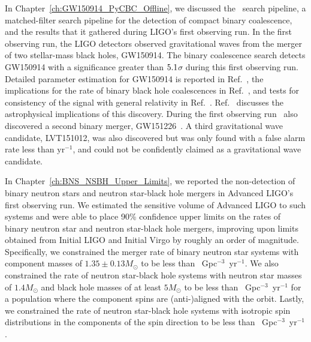 
In Chapter~\ref{ch:GW150914_PyCBC_Offline}, we discussed the \pycbc{}\ search pipeline, a matched-filter
search pipeline for the detection of compact binary coalescence, and the results
that it gathered during LIGO's first observing run. In the first observing run, the LIGO detectors observed
gravitational waves from the merger of two
stellar-mass black holes, GW150914. The binary coalescence search detects GW150914 with
a significance greater than $5.1$$\sigma$ during this first observing
run. Detailed parameter estimation for
GW150914 is reported in Ref.~\cite{GW150914-PARAMESTIM}, the implications for
the rate of binary black hole coalescences in Ref.~\cite{GW150914-RATES}, and
tests for consistency of the signal with general relativity in
Ref.~\cite{GW150914-TESTOFGR}.  Ref.~\cite{GW150914-ASTRO} discusses the
astrophysical implications of this discovery. During the first observing run
\pycbc{}\ also discovered a second binary merger, GW151226~\cite{Abbott:2016nmj}. A third
gravitational wave candidate, LVT151012, was also discovered but was only found
with a false alarm rate less than \CBCSECONDEVENTFAR $\text{yr}^{-1}$, and could not be
confidently claimed as a gravitational wave candidate.

In Chapter~\ref{ch:BNS_NSBH_Upper_Limits}, we reported the non-detection of binary neutron stars and neutron star-black hole mergers
in Advanced \ac{LIGO}'s first observing run.
We estimated the sensitive volume of Advanced \ac{LIGO} to such systems and were able to place 90\%
confidence upper limits on the rates of binary neutron star and neutron star-black hole mergers, improving upon limits
obtained from Initial \ac{LIGO} and Initial Virgo by roughly an order of magnitude.
Specifically, we constrained the merger rate of binary neutron star systems with component masses of $1.35\pm0.13M_{\odot}$
to be less than \MainBNSULPyCBCHighSpin~Gpc$^{-3}$~yr$^{-1}$. We also constrained
the rate of neutron star-black hole systems with neutron star masses of $1.4 M_\odot$ and black hole masses
of at least $5 M_{\odot}$ to be less than \MainNSBHULPyCBCFiveAligned~Gpc$^{-3}$~yr$^{-1}$
for a population where the component spins are (anti-)aligned with
the orbit. Lastly, we constrained the rate of neutron star-black hole systems with isotropic spin distributions in the
components of the spin direction to be less than \MainNSBHULPyCBCFiveIso~Gpc$^{-3}$~yr$^{-1}$.

